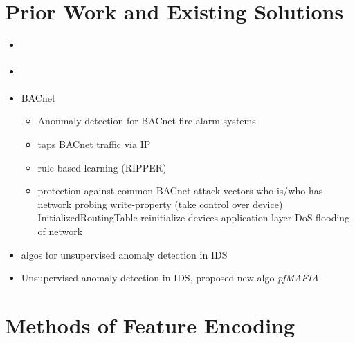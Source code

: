 \section{Prior Work and Existing Solutions}
\label{sec:background:network:priorwork}

\begin{itemize}
	\item \parencite{Yang2006}
	\item \parencite{Celeda2012}
	\item \textcite{Pan2014} BACnet
		\begin{itemize}
			\item Anonmaly detection for BACnet fire alarm systems
			\item taps BACnet traffic via IP
			\item rule based learning (RIPPER)
			\item protection against common BACnet attack vectors
				\subitem who-is/who-has network probing
				\subitem write-property (take control over device)
				\subitem InitializedRoutingTable
				\subitem reinitialize devices
				\subitem application layer DoS
				\subitem flooding of network
		\end{itemize}
	
	\item \textcite{Eskin2002} algos for unsupervised anomaly detection in IDS
	\item \textcite{Leung2005} Unsupervised anomaly detection in IDS, proposed new algo \emph{pfMAFIA}
\end{itemize}

\section{Methods of Feature Encoding}
\label{sec:background:network:features}
\label{sec:background:network:features:hashing}
\label{sec:background:network:features:onehot}

